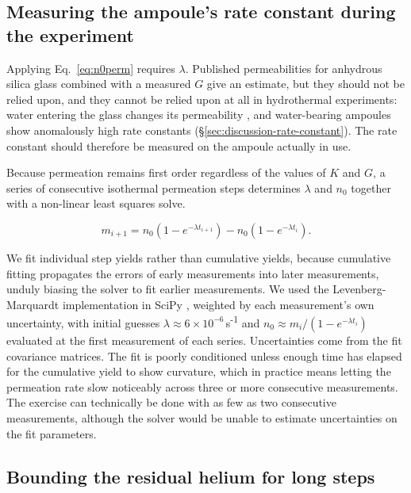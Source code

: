 \subsection{Measuring the ampoule's rate constant during the experiment}\label{sec:rate-constant}

Applying Eq.~\eqref{eq:n0perm} requires $\lambda$. Published permeabilities for anhydrous silica glass \citep{norton1953,altemose1961,swets1961,masaryk1968} combined with a measured $G$ give an estimate, but they should not be relied upon, and they cannot be relied upon at all in hydrothermal experiments: water entering the glass changes its permeability \citep{shelby1972,tsuru2011}, and water-bearing ampoules show anomalously high rate constants (\S\ref{sec:discussion-rate-constant}). The rate constant should therefore be measured on the ampoule actually in use.

Because permeation remains first order regardless of the values of $K$ and $G$, a series of consecutive isothermal permeation steps determines $\lambda$ and $n_{0}$ together with a non-linear least squares solve.

\begin{equation}
\label{eq:incyield}
m_{i+1} = n_{0}\left(1 - e^{-\lambda t_{i+1}}\right) - n_{0}\left(1 - e^{-\lambda t_{i}}\right) .
\end{equation}

We fit individual step yields rather than cumulative yields, because cumulative fitting propagates the errors of early measurements into later measurements, unduly biasing the solver to fit earlier measurements. We used the Levenberg-Marquardt implementation in SciPy \citep{virtanen2020}, weighted by each measurement's own uncertainty, with initial guesses $\lambda \approx 6\times10^{-6}$\,s\textsuperscript{-1} and $n_{0} \approx m_{i}/(1-e^{-\lambda t_{i}})$ evaluated at the first measurement of each series. Uncertainties come from the fit covariance matrices. The fit is poorly conditioned unless enough time has elapsed for the cumulative yield to show curvature, which in practice means letting the permeation rate slow noticeably across three or more consecutive measurements. The exercise can technically be done with as few as two consecutive measurements, although the solver would be unable to estimate uncertainties on the fit parameters. 

\subsection{Bounding the residual helium for long steps}\label{sec:bounding}

